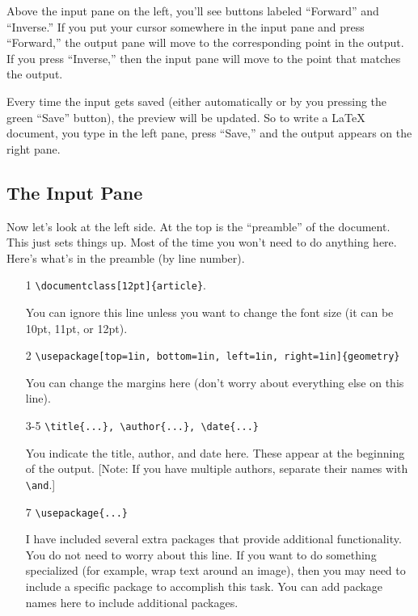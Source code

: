 \documentclass[12pt]{article}
\begin{document}
Above the input pane on the left, you'll see buttons labeled ``Forward'' and ``Inverse.'' If you put your cursor somewhere in the input pane and press ``Forward,'' the output pane will move to the corresponding point in the output. If you press ``Inverse,'' then the input pane will move to the point that matches the output.

Every time the input gets saved (either automatically or by you pressing the green ``Save'' button), the preview will be updated. So to write a \LaTeX{} document, you type in the left pane, press ``Save,'' and the output appears on the right pane.

\subsection{The Input Pane}

Now let's look at the left side. At the top is the ``preamble'' of the document. This just sets things up. Most of the time you won't need to do anything here. Here's what's in the preamble (by line number).

\begin{itemize}

\item[1] \verb|\documentclass[12pt]{article}|.

You can ignore this line unless you want to change the font size (it can be 10pt, 11pt, or 12pt).

\item[2] \verb|\usepackage[top=1in, bottom=1in, left=1in, right=1in]{geometry}|

You can change the margins here (don't worry about everything else on this line).

\item[3-5] \verb|\title{...}, \author{...}, \date{...}|

You indicate the title, author, and date here. These appear at the beginning of the output. [Note: If you have multiple authors, separate their names with \verb|\and|.]

\item[7] \verb|\usepackage{...}|

I have included several extra packages that provide additional functionality. You do not need to worry about this line. If you want to do something specialized (for example, wrap text around an image), then you may need to include a specific package to accomplish this task. You can add package names here to include additional packages.

\end{itemize}
\end{document}

